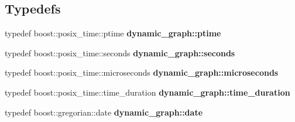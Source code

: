 \subsection*{Typedefs}
\begin{DoxyCompactItemize}
\item 
\mbox{\label{namespacedynamic__graph_a51b66113dc1d4eee03abd7779479cc69}} 
typedef boost\+::posix\+\_\+time\+::ptime {\bfseries dynamic\+\_\+graph\+::ptime}
\item 
\mbox{\label{namespacedynamic__graph_a6b06a10863ed1b2411191a895621dbb0}} 
typedef boost\+::posix\+\_\+time\+::seconds {\bfseries dynamic\+\_\+graph\+::seconds}
\item 
\mbox{\label{namespacedynamic__graph_a4244ef24ba8efe2112a5535fd562e8b4}} 
typedef boost\+::posix\+\_\+time\+::microseconds {\bfseries dynamic\+\_\+graph\+::microseconds}
\item 
\mbox{\label{namespacedynamic__graph_a4be0df79b9608a71968778c85d4a5f25}} 
typedef boost\+::posix\+\_\+time\+::time\+\_\+duration {\bfseries dynamic\+\_\+graph\+::time\+\_\+duration}
\item 
\mbox{\label{namespacedynamic__graph_a1a7a95fd96c4e7f1b829260880f14d91}} 
typedef boost\+::gregorian\+::date {\bfseries dynamic\+\_\+graph\+::date}
\end{DoxyCompactItemize}
